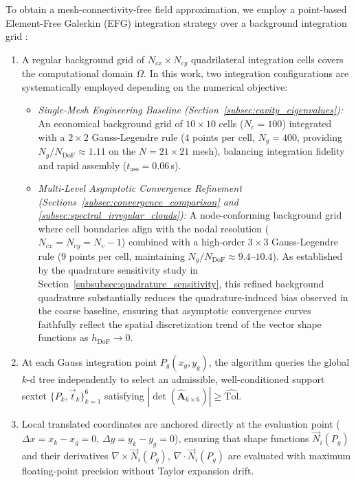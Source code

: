 \documentclass[preprint,12pt]{elsarticle}
\begin{document}
To obtain a mesh-connectivity-free field approximation, we employ a point-based Element-Free Galerkin (EFG) integration strategy over a background integration grid \cite{belytschko1994element, parreira2006efficient}:
\begin{enumerate}
    \item A regular background grid of $N_{cx} \times N_{cy}$ quadrilateral integration cells covers the computational domain $\Omega$. In this work, two integration configurations are systematically employed depending on the numerical objective:
    \begin{itemize}
        \item \emph{Single-Mesh Engineering Baseline (Section~\ref{subsec:cavity_eigenvalues}):} An economical background grid of $10 \times 10$ cells ($N_c = 100$) integrated with a $2 \times 2$ Gauss-Legendre rule ($4$ points per cell, $N_g = 400$, providing $N_g / N_{\mathrm{DoF}} \approx 1.11$ on the $N = 21 \times 21$ mesh), balancing integration fidelity and rapid assembly ($t_{\mathrm{ass}} = 0.06$\,s).
        \item \emph{Multi-Level Asymptotic Convergence Refinement (Sections~\ref{subsec:convergence_comparison} and \ref{subsec:spectral_irregular_clouds}):} A node-conforming background grid where cell boundaries align with the nodal resolution ($N_{cx} = N_{cy} = N_v - 1$) combined with a high-order $3 \times 3$ Gauss-Legendre rule ($9$ points per cell, maintaining $N_g / N_{\mathrm{DoF}} \approx 9.4\text{--}10.4$). As established by the quadrature sensitivity study in Section~\ref{subsubsec:quadrature_sensitivity}, this refined background quadrature substantially reduces the quadrature-induced bias observed in the coarse baseline, ensuring that asymptotic convergence curves faithfully reflect the spatial discretization trend of the vector shape functions as $h_{\mathrm{DoF}} \to 0$.
    \end{itemize}
    \item At each Gauss integration point $P_g(x_g, y_g)$, the algorithm queries the global $k$-d tree independently to select an admissible, well-conditioned support sextet $\{P_k, \vec{t}_k\}_{k=1}^6$ satisfying $|\det(\widehat{\mathbf{A}}_{6 \times 6})| \ge \widehat{\mathrm{Tol}}$.
    \item Local translated coordinates are anchored directly at the evaluation point ($\Delta x = x_k - x_g = 0$, $\Delta y = y_k - y_g = 0$), ensuring that shape functions $\vec{N}_i(P_g)$ and their derivatives $\nabla \times \vec{N}_i(P_g)$, $\nabla \cdot \vec{N}_i(P_g)$ are evaluated with maximum floating-point precision without Taylor expansion drift.
\end{enumerate}
\end{document}
